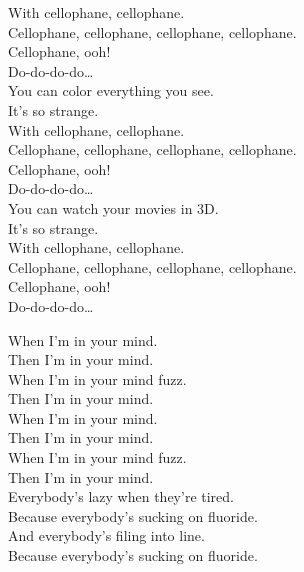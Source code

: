 With cellophane, cellophane. \\
Cellophane, cellophane, cellophane, cellophane. \\
Cellophane, ooh! \\
Do-do-do-do… \\

You can color everything you see. \\
It's so strange. \\

With cellophane, cellophane. \\
Cellophane, cellophane, cellophane, cellophane. \\
Cellophane, ooh! \\
Do-do-do-do… \\

You can watch your movies in 3D. \\
It's so strange. \\

With cellophane, cellophane. \\
Cellophane, cellophane, cellophane, cellophane. \\
Cellophane, ooh! \\
Do-do-do-do… \\





When I'm in your mind. \\
Then I'm in your mind. \\
When I'm in your mind fuzz. \\
Then I'm in your mind. \\

When I'm in your mind. \\
Then I'm in your mind. \\
When I'm in your mind fuzz. \\
Then I'm in your mind. \\

Everybody's lazy when they're tired. \\
Because everybody's sucking on fluoride. \\
And everybody's filing into line. \\
Because everybody's sucking on fluoride. \\

